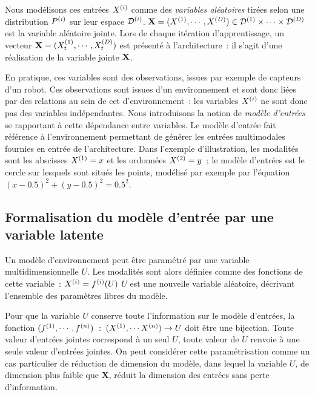 \documentclass[../main]{subfiles}
\begin{document}
Nous modélisons ces entrées $X^{({i})}$ comme des \emph{variables aléatoires} tirées selon une distribution $P^{({i})}$ sur leur espace $\mathcal{D}^{({i})}$.
$\mathbf{X} = (X^{({1})}, \cdots, X^{({D})}) \in \mathcal{D}^{({1})} \times \cdots \times \mathcal{D}^{({D})}$ est la variable aléatoire jointe. 
Lors de chaque itération d'apprentissage, un vecteur $\mathbf{X} = (X^{({1})}_t, \cdots , X^{({D})}_t)$ est présenté à l'architecture~: il s'agit d'une réalisation de la variable jointe $\mathbf{X}$.


En pratique, ces variables sont des observations, issues par exemple de capteurs d'un robot. Ces observations sont issues d'un environnement et sont donc liées par des relations au sein de cet d'environnement~: les variables $X^{({i})}$ ne sont donc pas des variables indépendantes.
Nous introduisons la notion de \emph{modèle d'entrées} se rapportant à cette dépendance entre variables.
Le modèle d'entrée fait référence à l'environnement permettant de générer les entrées multimodales fournies en entrée de l'architecture. Dans l'exemple d'illustration, les modalités sont les abscisses $X^{({1})} = x$ et les ordonnées $X^{({2})} = y$~; le modèle d'entrées est le cercle sur lesquels sont situés les points, modélisé par exemple par l'équation $(x - 0.5)^2 + (y - 0.5)^2 = 0.5^2$.

\subsection{Formalisation du modèle d'entrée par une variable latente}

Un modèle d'environnement peut être paramétré par une variable multidimensionnelle $U$. 
Les modalités sont alors définies comme des fonctions de cette variable~:
$X^{({i})} = f^{({i})}(U)$
$U$ est une nouvelle variable aléatoire, décrivant l'ensemble des paramètres libres du modèle.

Pour que la variable $U$ conserve toute l'information sur le modèle d'entrées, la fonction $(f^{({1})}, \cdots, f^{({n})})$~:~$(X^{({1})}, \cdots X^{({n})})\rightarrow U$ doit être une bijection. 
Toute valeur d'entrées jointes correspond à un seul $U$, toute valeur de $U$ renvoie à une seule valeur d'entrées jointes. 
On peut considérer cette paramétrisation comme un cas particulier de réduction de dimension du modèle, dans lequel la variable $U$, de dimension plus faible que $\mathbf{X}$, réduit la dimension des entrées sans perte d'information.
\end{document}
